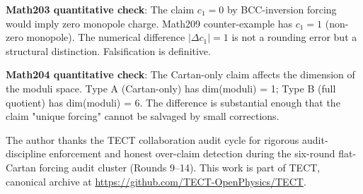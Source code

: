 \textbf{Math203 quantitative check}: The claim $c_1 = 0$ by BCC-inversion forcing
would imply zero monopole charge. Math209 counter-example has $c_1 = 1$ (non-zero
monopole). The numerical difference $|\Delta c_1| = 1$ is not a rounding error but a
structural distinction. Falsification is definitive.

\textbf{Math204 quantitative check}: The Cartan-only claim affects the dimension
of the moduli space. Type A (Cartan-only) has dim(moduli) = 1; Type B
(full quotient) has dim(moduli) = 6. The difference is substantial enough that
the claim "unique forcing" cannot be salvaged by small corrections.

\begin{acknowledgments}
The author thanks the TECT collaboration audit cycle for rigorous
audit-discipline enforcement and honest over-claim detection during
the six-round flat-Cartan forcing audit cluster (Rounds 9--14). This work is part of TECT,
canonical archive at \url{https://github.com/TECT-OpenPhysics/TECT}.
\end{acknowledgments}





